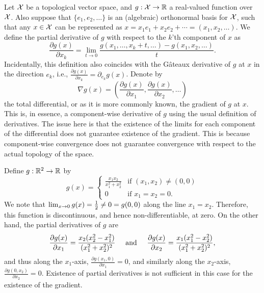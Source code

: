 

Let ${\mathcal X}$ be a topological vector space, and $g:{\mathcal X}\to\mathbb{R}$ a real-valued function over ${\mathcal X}$.
Also suppose that $\{e_1,e_2,\dots\}$ is an (algebraic) orthonormal basis for ${\mathcal X}$, such that any $x\in{\mathcal X}$ can be represented as $x = x_1e_1 + x_2e_2 + \cdots = (x_1,x_2,\dots)$.
We define the partial derivative of $g$ with respect to the $k$'th component of $x$ as
\[
  \frac{\partial g(x)}{\partial x_k}  = \lim_{t\to 0} \frac{g(x_1,\dots,x_k+t,\dots) - g(x_1,x_2,\dots)}{t}.
\]
Incidentally, this definition also coincides with the Gâteaux derivative of $g$ at $x$ in the direction $e_k$, i.e., $\frac{\partial g(x)}{\partial x_k} = \partial_{e_k}g(x)$.
Denote by 
\[
  \nabla g(x) = \left(
  \frac{\partial g(x)}{\partial x_1}, 
  \frac{\partial g(x)}{\partial x_2},
  \dots
  \right)
\]
the total differential, or as it is more commonly known, the gradient of $g$ at $x$.
This is, in essence, a component-wise derivative of $g$ using the usual definition of derivatives.
The issue here is that the existence of the limits for each component of the differential does not guarantee existence of the gradient.
This is because component-wise convergence does not guarantee convergence with respect to the actual topology of the  space.

\begin{example}
Define $g:\mathbb{R}^2\to\mathbb{R}$ by
\[
  g(x) = 
  \begin{cases}
    \displaystyle\frac{x_1x_2}{x_1^2 + x_2^2} &\text{if } (x_1,x_2) \neq (0,0) \\
    0 &\text{if } x_1=x_2=0.
  \end{cases}
\]
We note that $\lim_{x\to 0} g(x) = \frac{1}{2} \neq 0 = g(0,0)$ along the line $x_1 = x_2$.
Therefore, this function is discontinuous, and hence non-differentiable, at zero.
On the other hand, the partial derivatives of $g$ are 
\[
  \frac{\partial g(x)}{\partial x_1} = \frac{x_2(x_2^2-x_1^2)}{(x_1^2+x_2^2)^2}
  \hspace{0.5cm}\text{and}\hspace{0.5cm}
  \frac{\partial g(x)}{\partial x_2} = \frac{x_1(x_1^2-x_2^2)}{(x_1^2+x_2^2)^2},
\]
and thus along the $x_1$-axis, $\frac{\partial g(x_1,0)}{\partial x_1} = 0$, and similarly along the $x_2$-axis, $\frac{\partial g(0,x_2)}{\partial x_2} = 0$.
Existence of partial derivatives is not sufficient in this case for the existence of the gradient.

\end{example}
